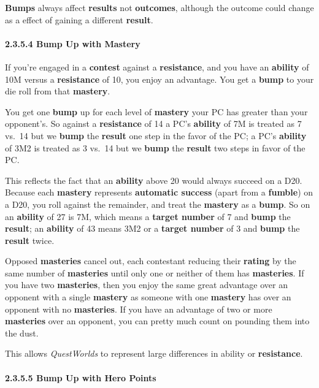 \documentclass[
]{article}
\begin{document}
\textbf{Bumps} always affect \textbf{results} not \textbf{outcomes},
although the outcome could change as a effect of gaining a different
\textbf{result}.

\hypertarget{bump-up-with-mastery}{%
\paragraph{2.3.5.4 Bump Up with Mastery}\label{bump-up-with-mastery}}

If you're engaged in a \textbf{contest} against a \textbf{resistance},
and you have an \textbf{ability} of 10M versus a \textbf{resistance} of
10, you enjoy an advantage. You get a \textbf{bump} to your die roll
from that \textbf{mastery}.

You get one \textbf{bump} up for each level of \textbf{mastery} your PC
has greater than your opponent's. So against a \textbf{resistance} of 14
a PC's \textbf{ability} of 7M is treated as 7 vs.~14 but we
\textbf{bump} the \textbf{result} one step in the favor of the PC; a
PC's \textbf{ability} of 3M2 is treated as 3 vs.~14 but we \textbf{bump}
the \textbf{result} two steps in favor of the PC.

This reflects the fact that an \textbf{ability} above 20 would always
succeed on a D20. Because each \textbf{mastery} represents
\textbf{automatic success} (apart from a \textbf{fumble}) on a D20, you
roll against the remainder, and treat the \textbf{mastery} as a
\textbf{bump}. So on an \textbf{ability} of 27 is 7M, which means a
\textbf{target number} of 7 and \textbf{bump} the \textbf{result}; an
\textbf{ability} of 43 means 3M2 or a \textbf{target number} of 3 and
\textbf{bump} the \textbf{result} twice.

Opposed \textbf{masteries} cancel out, each contestant reducing their
\textbf{rating} by the same number of \textbf{masteries} until only one
or neither of them has \textbf{masteries}. If you have two
\textbf{masteries}, then you enjoy the same great advantage over an
opponent with a single \textbf{mastery} as someone with one
\textbf{mastery} has over an opponent with no \textbf{masteries}. If you
have an advantage of two or more \textbf{masteries} over an opponent,
you can pretty much count on pounding them into the dust.

This allows \emph{QuestWorlds} to represent large differences in ability
or \textbf{resistance}.

\hypertarget{bump-up-with-hero-points}{%
\paragraph{2.3.5.5 Bump Up with Hero
Points}\label{bump-up-with-hero-points}}
\end{document}
